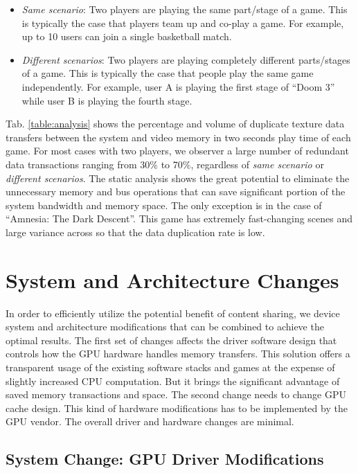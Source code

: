 \documentclass[pageno]{jpaper}
\begin{document}
	\begin{itemize}
		\item {\emph{Same scenario}: Two players are playing the same part/stage of a game. This is typically the case that players team up and co-play a game. For example, up to 10 users can join a single basketball match.}
		\item {\emph{Different scenarios}: Two players are playing completely different parts/stages of a game. This is typically the case that people play the same game independently. For example, user A is playing the first stage of ``Doom 3'' while user B is playing the fourth stage.}
	\end{itemize}


	Tab. \ref{table:analysis} shows the percentage and volume of duplicate texture data transfers between the system and video memory in two seconds play time of each game. For most cases with two players, we observer a large number of redundant data transactions ranging from 30\% to 70\%, regardless of \emph{same scenario} or \emph{different scenarios}. The static analysis shows the great potential to eliminate the unnecessary memory and bus operations that can save significant portion of the system bandwidth and memory space. The only exception is in the case of ``Amnesia: The Dark Descent''. This game has extremely fast-changing scenes and large variance across so that the data duplication rate is low.


\section{System and Architecture Changes} \label{sec:contributions}

In order to efficiently utilize the potential benefit of content sharing, we device system and architecture modifications that can be combined to
achieve the optimal results. The first set of changes affects the driver software design that controls how the GPU
hardware handles memory transfers. This solution offers a transparent
usage of the existing software stacks and games at the expense of slightly
increased CPU computation. But it brings the significant advantage of saved memory transactions and space. The second change needs to change GPU cache design. This kind of hardware modifications has to be implemented by the GPU vendor. The overall driver and hardware changes are minimal.

\subsection{System Change: GPU Driver Modifications}
\end{document}
